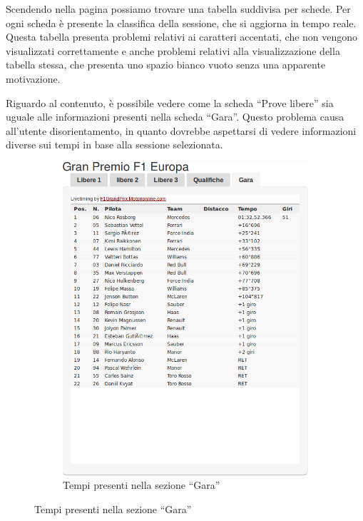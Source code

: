 Scendendo nella pagina possiamo trovare una tabella suddivisa per
schede. Per ogni scheda è presente la classifica della sessione, che si aggiorna
in tempo reale. Questa tabella presenta problemi relativi ai caratteri
accentati, che non vengono visualizzati correttamente e anche problemi relativi
alla visualizzazione della tabella stessa, che presenta uno spazio bianco
vuoto senza una apparente motivazione.

Riguardo al contenuto, è possibile vedere come la scheda ``Prove libere''
sia uguale alle informazioni presenti nella scheda ``Gara''. Questo problema
causa all'utente disorientamento, in quanto dovrebbe aspettarsi di vedere
informazioni diverse sui tempi in base alla sessione selezionata.

\begin{figure}[H]
    \centering
    \begin{subfigure}[b]{0.45\textwidth}
        \includegraphics[scale=0.25]{res/img/dettagli/tableScoreR}
        \caption{Tempi presenti nella sezione ``Gara''}
    \end{subfigure}

\end{figure}
